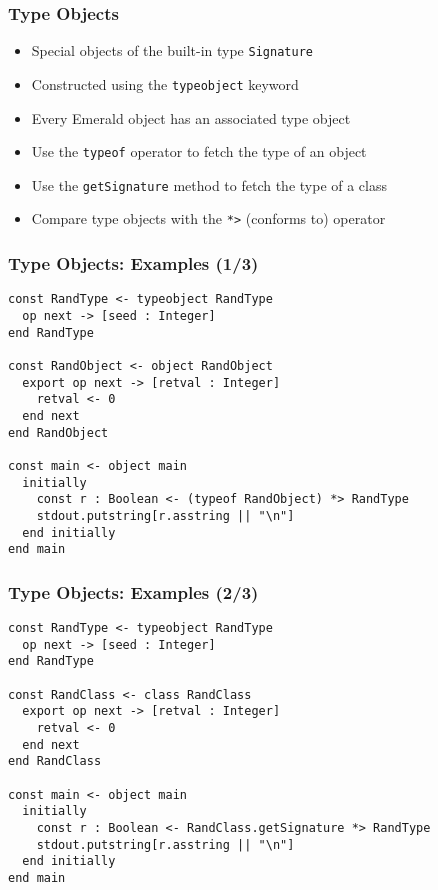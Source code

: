 \begin{frame}

\frametitle{Type Objects}

\begin{itemize}

\item Special objects of the built-in type \lstinline{Signature}

\item Constructed using the \lstinline{typeobject} keyword

\item Every Emerald object has an associated type object

\item Use the \lstinline{typeof} operator to fetch the type of an object

\item Use the \lstinline{getSignature} method to fetch the type of a class

\item Compare type objects with the \lstinline{*>} (conforms to)
operator

\end{itemize}

\end{frame}

\begin{frame}[fragile]

\frametitle{Type Objects: Examples (1/3)}

\begin{lstlisting}
const RandType <- typeobject RandType
  op next -> [seed : Integer]
end RandType

const RandObject <- object RandObject
  export op next -> [retval : Integer]
    retval <- 0
  end next
end RandObject

const main <- object main
  initially
    const r : Boolean <- (typeof RandObject) *> RandType
    stdout.putstring[r.asstring || "\n"]
  end initially
end main
\end{lstlisting}

\end{frame}

\begin{frame}[fragile]

\frametitle{Type Objects: Examples (2/3)}

\begin{lstlisting}
const RandType <- typeobject RandType
  op next -> [seed : Integer]
end RandType

const RandClass <- class RandClass
  export op next -> [retval : Integer]
    retval <- 0
  end next
end RandClass

const main <- object main
  initially
    const r : Boolean <- RandClass.getSignature *> RandType
    stdout.putstring[r.asstring || "\n"]
  end initially
end main
\end{lstlisting}

\end{frame}

